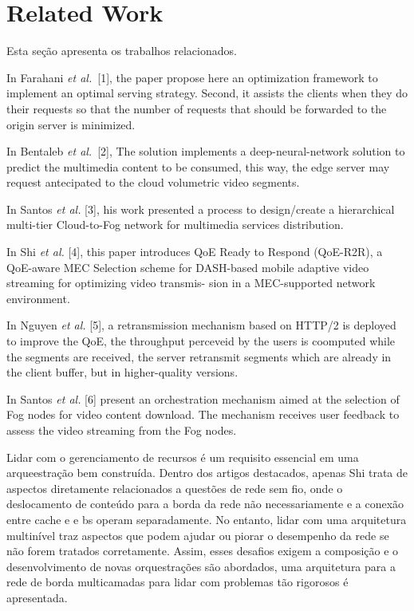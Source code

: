 \section{Related Work}

Esta seção apresenta os trabalhos relacionados.

In Farahani \textit{et al.}~[1], the paper propose here an optimization framework to implement an optimal serving strategy. Second, it assists the clients when they do their requests so that the number of requests that should be forwarded to the origin server is minimized.

In Bentaleb \textit{et al.}~[2], The solution implements a deep-neural-network solution to predict  the multimedia content to be consumed, this way, the edge server may request antecipated to the cloud volumetric video segments.

In Santos \textit{et al.} [3], his work presented a process to design/create a hierarchical multi-tier Cloud-to-Fog network for multimedia services distribution.

In Shi \textit{et al.} [4], this paper introduces QoE Ready to Respond (QoE-R2R), a QoE-aware MEC Selection scheme for DASH-based mobile adaptive video streaming for optimizing video transmis- sion in a MEC-supported network environment.

In Nguyen \textit{et al.} [5], a retransmission mechanism based on  HTTP/2 is deployed to improve the QoE, the throughput perceveid by the users is coomputed while the segments are received, the server retransmit segments which are already in the client buffer, but in higher-quality versions.

In Santos \textit{et al.} [6] present an orchestration mechanism aimed at the selection of Fog nodes for video content download. The mechanism receives user feedback to assess the video streaming from the Fog nodes.

Lidar com o gerenciamento de recursos é um requisito essencial em uma arqueestração bem construída. Dentro dos artigos destacados, apenas Shi trata de aspectos diretamente relacionados a questões de rede sem fio, onde o deslocamento de conteúdo para a borda da rede não necessariamente e a conexão entre cache e e bs operam separadamente. No entanto, lidar com uma arquitetura multinível traz aspectos que podem ajudar ou piorar o desempenho da rede se não forem tratados corretamente. Assim, esses desafios exigem a composição e o desenvolvimento de novas orquestrações são abordados, uma arquitetura para a rede de borda multicamadas para lidar com problemas tão rigorosos é apresentada.